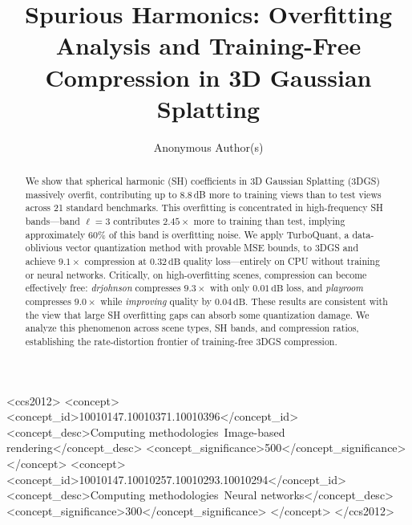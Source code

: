 \documentclass[sigconf,review]{acmart}
\newcommand{\dB}{\,\text{dB}}
\begin{document}
\title[Spurious Harmonics for 3DGS]{Spurious Harmonics: Overfitting Analysis and Training-Free\texorpdfstring{\\}{}Compression in 3D Gaussian Splatting}

\author{Anonymous Author(s)}

\begin{abstract}
We show that spherical harmonic (SH) coefficients in 3D Gaussian Splatting (3DGS) massively overfit, contributing up to 8.8\,dB more to training views than to test views across 21 standard benchmarks.
This overfitting is concentrated in high-frequency SH bands---band $\ell{=}3$ contributes $2.45{\times}$ more to training than test, implying approximately 60\% of this band is overfitting noise.
We apply TurboQuant, a data-oblivious vector quantization method with provable MSE bounds, to 3DGS and achieve $9.1{\times}$ compression at $0.32\dB$ quality loss---entirely on CPU without training or neural networks.
Critically, on high-overfitting scenes, compression can become effectively free: \textit{drjohnson} compresses $9.3{\times}$ with only $0.01\dB$ loss, and \textit{playroom} compresses $9.0{\times}$ while \emph{improving} quality by $0.04\dB$.
These results are consistent with the view that large SH overfitting gaps can absorb some quantization damage.
We analyze this phenomenon across scene types, SH bands, and compression ratios, establishing the rate-distortion frontier of training-free 3DGS compression.
\end{abstract}

\begin{CCSXML}
<ccs2012>
<concept>
<concept_id>10010147.10010371.10010396</concept_id>
<concept_desc>Computing methodologies~Image-based rendering</concept_desc>
<concept_significance>500</concept_significance>
</concept>
<concept>
<concept_id>10010147.10010257.10010293.10010294</concept_id>
<concept_desc>Computing methodologies~Neural networks</concept_desc>
<concept_significance>300</concept_significance>
</concept>
</ccs2012>
\end{CCSXML}



\maketitle
\end{document}
